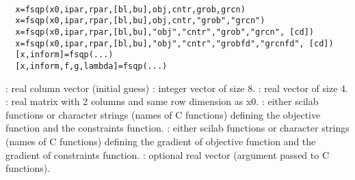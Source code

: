 
\begin{mandesc}
  \\ %
\end{mandesc}
\begin{calling_sequence}
\begin{verbatim}
  x=fsqp(x0,ipar,rpar,[bl,bu],obj,cntr,grob,grcn)  
  x=fsqp(x0,ipar,rpar,[bl,bu],obj,cntr,"grob","grcn")  
  x=fsqp(x0,ipar,rpar,[bl,bu],"obj","cntr","grob","grcn", [cd])  
  x=fsqp(x0,ipar,rpar,[bl,bu],"obj","cntr","grobfd","grcnfd", [cd])  
  [x,inform]=fsqp(...)  
  [x,inform,f,g,lambda]=fsqp(...)  
\end{verbatim}
\end{calling_sequence}

\begin{parameters}
  \begin{varlist}
    : real column vector (initial guess)
    : integer vector of size 8.
    : real vector of size 4.
    \vname{[bl,bu]}
    : real matrix with 2 columns and same row dimension as x0.
    : either scilab functions or character strings (names of C functions) defining the objective function and the constraints function.
    : either scilab functions or character strings (names of C functions) defining the gradient of objective function and the gradient of  constraints function.
    : optional real vector (argument passed to C functions).
  \end{varlist}
\end{parameters}

